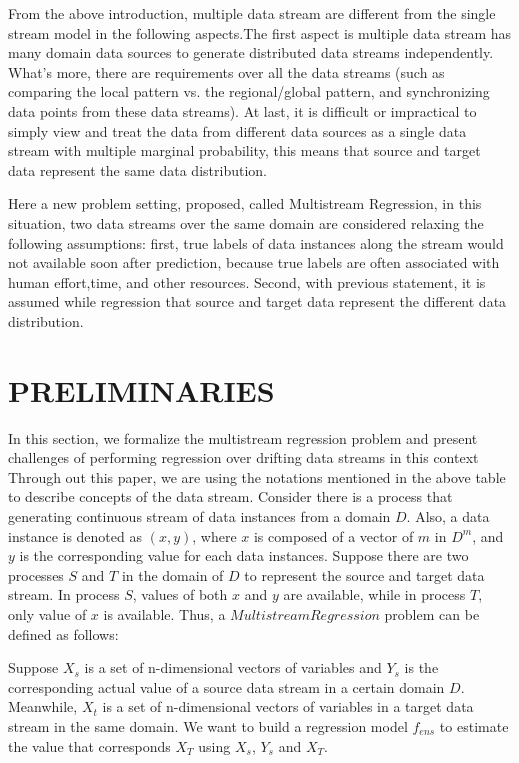   From  the  above introduction,  multiple data stream are  different  from the  single stream model in the following aspects.The first aspect is multiple data stream has many domain data sources to generate distributed data streams independently. What's more, there are requirements over all  the  data  streams  (such as comparing the  local  pattern  vs. the regional/global  pattern,  and synchronizing data points  from  these  data  streams). At last, it  is difficult  or  impractical  to  simply  view  and  treat  the  data  from different  data  sources  as  a  single  data  stream  with  multiple marginal probability, this means that source and target data 
represent the same data distribution.
  
  Here a new problem setting, proposed, called Multistream Regression, in this situation, two data streams over the same domain are considered relaxing the following assumptions:  first, true labels of data instances along the stream would not available soon after prediction, because true labels are often associated with human effort,time, and other resources. Second, with previous statement, it is assumed while regression that source and target data represent the different data distribution.
  
 


\section{PRELIMINARIES}
\label{notations}
In this section, we formalize the multistream regression problem and present challenges of performing  regression over drifting data streams in this context
Through out this paper, we are using the notations mentioned in 
the above table to describe concepts of the data stream. 
Consider there is a process that generating continuous stream of 
data instances from a domain $D$. Also, a data instance is
denoted as $(x, y)$, where $x$ is composed of a vector of $m$ in
${D^{m}}$, and $y$ is the corresponding value for each data
instances. Suppose there are two processes $S$ and $T$ in
the domain of $D$ to represent the source and target data stream.
In process $S$, values of both $x$ and $y$ are available, while
in process $T$, only value of $x$ is available. Thus, a 
$Multistream Regression$ problem can be defined as follows:

Suppose $X_{s}$ is a set of n-dimensional vectors of variables
and $Y_{s}$ is the corresponding actual value of a source data 
stream in a certain domain $D$. Meanwhile, $X_{t}$ is a set of 
n-dimensional vectors of variables in a target data stream in the
same domain. We want to build a regression model $f_{ens}$ to
estimate the value that corresponds $X_{T}$ using $X_{s}$,
$Y_{s}$ and $X_{T}$.

